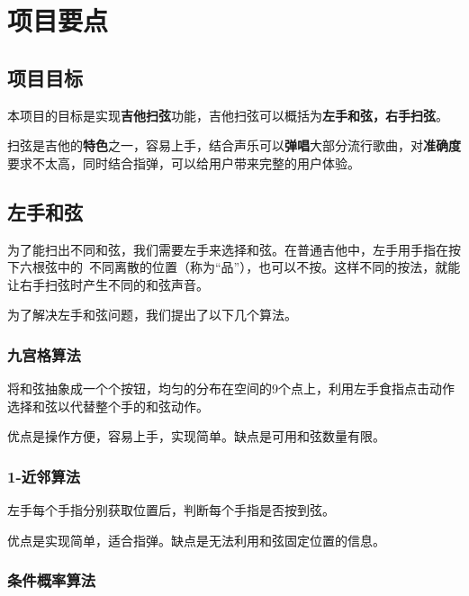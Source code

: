 \chapter{项目要点}

    \section{项目目标}

        本项目的目标是实现\textbf{吉他扫弦}功能，吉他扫弦可以概括为\textbf{左手和弦，右手扫弦}。

        扫弦是吉他的\textbf{特色}之一，容易上手，结合声乐可以\textbf{弹唱}大部分流行歌曲，对\textbf{准确度}要求不太高，同时结合指弹，可以给用户带来完整的用户体验。
        
    \section{左手和弦}

        为了能扫出不同和弦，我们需要左手来选择和弦。在普通吉他中，左手用手指在按下六根弦中的\
        不同离散的位置（称为“品”），也可以不按。这样不同的按法，就能让右手扫弦时产生不同的和弦声音。


        为了解决左手和弦问题，我们提出了以下几个算法。

        \subsection{九宫格算法}

        将和弦抽象成一个个按钮，均匀的分布在空间的9个点上，利用左手食指点击动作选择和弦以代替整个手的和弦动作。

        优点是操作方便，容易上手，实现简单。缺点是可用和弦数量有限。

        \subsection{1-近邻算法}

        左手每个手指分别获取位置后，判断每个手指是否按到弦。

        优点是实现简单，适合指弹。缺点是无法利用和弦固定位置的信息。

        \subsection{条件概率算法}

